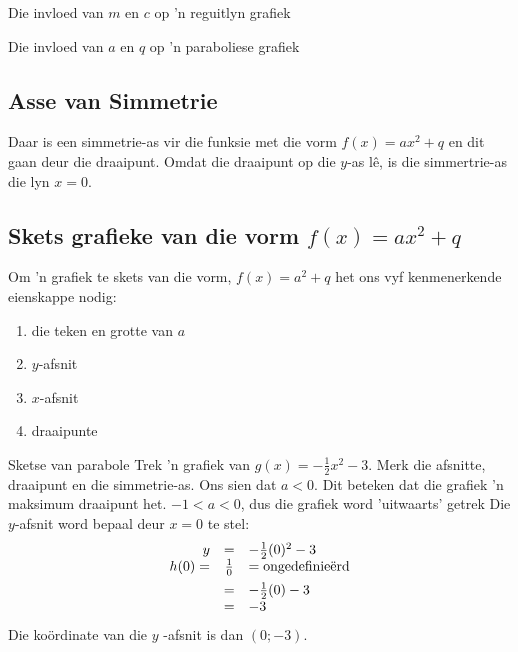 \begin{Ondersoek}{Die invloed van $m$ en $c$ op 'n reguitlyn grafiek}
\begin{Ondersoek}{Die invloed van $a$ en $q$ op 'n paraboliese grafiek}
\subsection*{Asse van Simmetrie}

Daar is een simmetrie-as vir die funksie met die vorm $f(x)=ax^{2}+q$ en dit gaan deur die draaipunt. Omdat die draaipunt op die $y$-as lê, is die simmertrie-as die lyn $x=0$. 

\subsection*{Skets grafieke van die vorm $f(x)=ax^{2}+q$}

Om ’n grafiek te skets van die vorm, $f(x)=a^{2}+q$ het ons vyf kenmenerkende eienskappe nodig:
\begin{enumerate}[noitemsep, label=\textbf{\arabic*}. ] 
\item die teken en grotte van $a$
\item $y$-afsnit
\item $x$-afsnit
\item draaipunte

\end{enumerate}

\begin{wex}
 {Sketse van parabole}
{Trek 'n grafiek van $g(x)=-\frac{1}{2}x^{2}-3$.  Merk die afsnitte, draaipunt en die simmetrie-as.}
{
Ons sien dat $a<0$.  Dit beteken dat die grafiek ’n maksimum draaipunt het. $-1 < a < 0$, dus die grafiek word 'uitwaarts' getrek
Die $y$-afsnit word bepaal deur $x=0$ te stel:
\begin{equation*}
\begin{array}{ccl}\hfill {y}& =& -\frac{1}{2}(0)^{2}-3\hfill \\
 h(0) =& \frac{1}{0} &= \mbox{ongedefinieërd}\vspace{5pt} \\ 
 & =& -\frac{1}{2}(0)-3\hfill \\
 & =& -3\hfill 
\end{array}
\end{equation*}
Die koördinate van die $y$ -afsnit is dan $(0; -3)$.\\

}
\end{wex}
\end{Ondersoek}
\end{Ondersoek}

